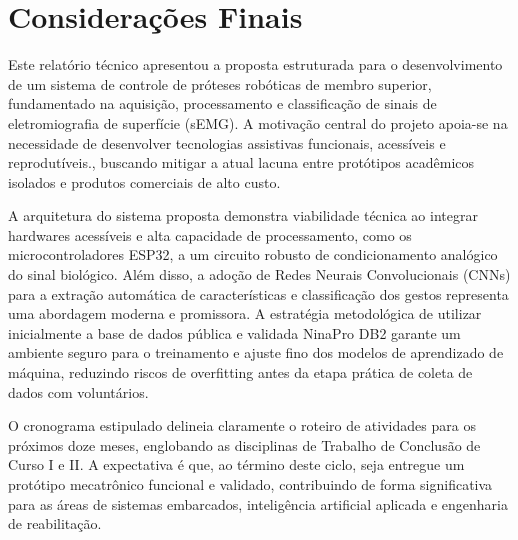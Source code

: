 \chapter{Considerações Finais}

Este relatório técnico apresentou a proposta estruturada para o desenvolvimento de um sistema de controle de próteses robóticas de membro superior, fundamentado na aquisição, processamento e classificação de sinais de eletromiografia de superfície (sEMG). A motivação central do projeto apoia-se na necessidade de desenvolver tecnologias assistivas funcionais, acessíveis e reprodutíveis., buscando mitigar a atual lacuna entre protótipos acadêmicos isolados e produtos comerciais de alto custo.

A arquitetura do sistema proposta demonstra viabilidade técnica ao integrar hardwares acessíveis e alta capacidade de processamento, como os microcontroladores ESP32, a um circuito robusto de condicionamento analógico do sinal biológico. Além disso, a adoção de Redes Neurais Convolucionais (CNNs) para a extração automática de características e classificação dos gestos representa uma abordagem moderna e promissora. A estratégia metodológica de utilizar inicialmente a base de dados pública e validada NinaPro DB2 garante um ambiente seguro para o treinamento e ajuste fino dos modelos de aprendizado de máquina, reduzindo riscos de overfitting antes da etapa prática de coleta de dados com voluntários.

O cronograma estipulado delineia claramente o roteiro de atividades para os próximos doze meses, englobando as disciplinas de Trabalho de Conclusão de Curso I e II. A expectativa é que, ao término deste ciclo, seja entregue um protótipo mecatrônico funcional e validado, contribuindo de forma significativa para as áreas de sistemas embarcados, inteligência artificial aplicada e engenharia de reabilitação.